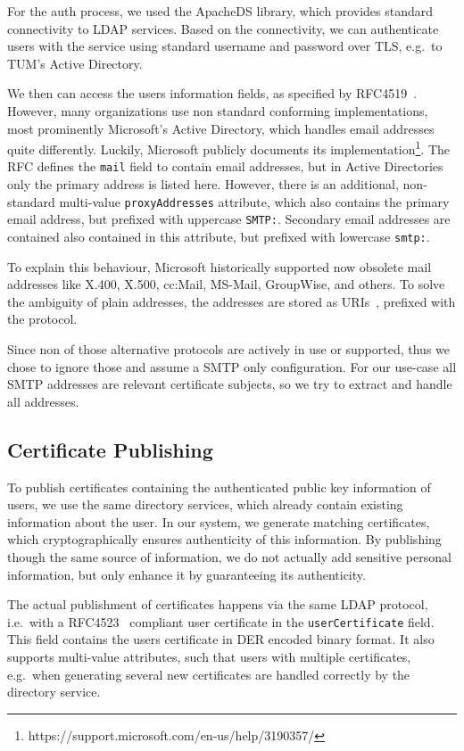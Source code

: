 For the auth process, we used the ApacheDS library, which provides standard connectivity to LDAP services.
Based on the connectivity, we can authenticate users with the service using standard username and password over TLS,
e.g.\ to TUM's Active Directory.

We then can access the users information fields, as specified by RFC4519~\cite{RFC4519}.
However, many organizations use non standard conforming implementations, most prominently Microsoft's Active Directory,
which handles email addresses quite differently.
Luckily, Microsoft publicly documents its implementation\footnote{https://support.microsoft.com/en-us/help/3190357/}.
The RFC defines the \lstinline{mail} field to contain email addresses, but in Active Directories only the primary
address is listed here.
However, there is an additional, non-standard multi-value \lstinline{proxyAddresses} attribute, which also contains the
primary email address, but prefixed with uppercase \lstinline{SMTP:}.
Secondary email addresses are contained also contained in this attribute, but prefixed with lowercase \lstinline{smtp:}.

To explain this behaviour, Microsoft historically supported now obsolete mail addresses like X.400, X.500, cc:Mail,
MS-Mail, GroupWise, and others.
To solve the ambiguity of plain addresses, the addresses are stored as URIs~\cite{RFC3986}, prefixed with the protocol.

Since non of those alternative protocols are actively in use or supported, thus we chose to ignore those and assume a
SMTP only configuration.
For our use-case all SMTP addresses are relevant certificate subjects, so we try to extract and handle all addresses.

\subsection*{Certificate Publishing}
To publish certificates containing the authenticated public key information of users, we use the same directory
services, which already contain existing information about the user.
In our system, we generate matching certificates, which cryptographically ensures authenticity of this information.
By publishing though the same source of information, we do not actually add sensitive personal information, but only
enhance it by guaranteeing its authenticity.

The actual publishment of certificates happens via the same LDAP protocol, i.e.\ with a RFC4523~\cite{RFC4523} compliant
user certificate in the \lstinline{userCertificate} field.
This field contains the users certificate in DER encoded binary format.
It also supports multi-value attributes, such that users with multiple certificates, e.g.\ when generating several new
certificates are handled correctly by the directory service.

